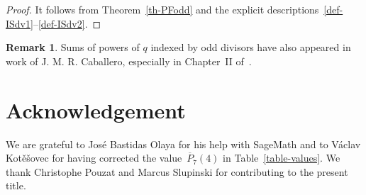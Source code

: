 \documentclass[11pt, a4paper]{amsart}
\theoremstyle{definition}
\newtheorem{rem}[theorem]{Remark}
\newcommand\Pg{\overline{P}}
\numberwithin{equation}{section}
\begin{document}
\begin{proof}
It follows from Theorem~\ref{th-PFodd} and the explicit descriptions~\eqref{def-ISdv1}--\eqref{def-ISdv2}.
\end{proof}

\begin{rem}
Sums of powers of $q$ indexed by odd divisors have also appeared in work of J. M. R. Caballero,
especially in Chapter~II of~\cite{RC1}.
\end{rem}

\section*{Acknowledgement}
We are grateful to Jos\'e Bastidas Olaya for his help with SageMath
and to V\'aclav Kot\v{e}\v{s}ovec for having corrected the value~$\Pg_7(4)$ in Table~\ref{table-values}.
We thank Christophe Pouzat and Marcus Slupinski for contributing to the present title.
\end{document}
